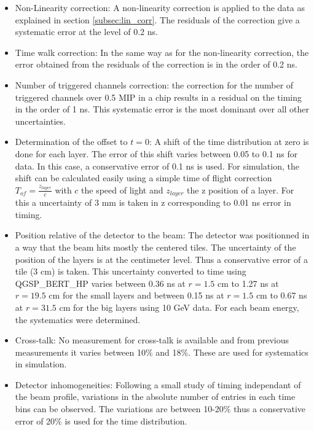 \begin{itemize}
	\item Non-Linearity correction: A non-linearity correction is applied to the data as explained in section \ref{subsec:lin_corr}. The residuals of the correction give a systematic error at the level of 0.2 ns.
	\item Time walk correction: In the same way as for the non-linearity correction, the error obtained from the residuals of the correction is in the order of 0.2 ns.
	\item Number of triggered channels correction: the correction for the number of triggered channels over 0.5 MIP in a chip results in a residual on the timing in the order of 1 ns. This systematic error is the most dominant over all other uncertainties.
	\item Determination of the offset to $t=0$: A shift of the time distribution at zero is done for each layer. The error of this shift varies between 0.05 to 0.1 ns for data. In this case, a conservative error of 0.1 ns is used. For simulation, the shift can be calculated easily using a simple time of flight correction $T_{of} = \frac{z_{layer}}{c}$ with $c$ the speed of light and $z_{layer}$ the z position of a layer. For this a uncertainty of 3 mm is taken in z corresponding to 0.01 ns error in timing.
	\item Position relative of the detector to the beam: The detector was positionned in a way that the beam hits mostly the centered tiles. The uncertainty of the position of the layers is at the centimeter level. Thus a conservative error of a tile (3 cm) is taken. This uncertainty converted to time using QGSP\_BERT\_HP varies between 0.36 ns at $r = 1.5$ cm to 1.27 ns at $r = 19.5$ cm for the small layers and between 0.15 ns at $r = 1.5$ cm to 0.67 ns at $r = 31.5$ cm for the big layers using 10 GeV data. For each beam energy, the systematics were determined.
	\item Cross-talk: No measurement for cross-talk is available and from previous measurements it varies between 10\% and 18\%. These are used for systematics in simulation.
	\item Detector inhomogeneities: Following a small study of timing independant of the beam profile, variations in the absolute number of entries in each time bins can be observed. The variations are between 10-20\% thus a conservative error of 20\% is used for the time distribution.

\end{itemize}
